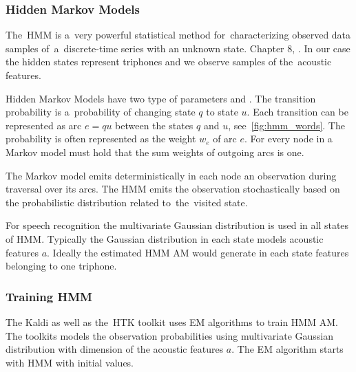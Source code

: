 {%
%     
%     

\subsubsection*{Hidden Markov Models}
The~\ac{HMM} is a~very powerful statistical method for~characterizing observed data samples
of~a~discrete-time series with an unknown state. Chapter 8, \cite{huang2001spoken}.
In our case the hidden states represent triphones and we observe samples of the~acoustic features.

Hidden Markov Models have two type of parameters 
and .
The transition probability is a~probability of changing state $q$ to state $u$.
Each transition can be represented as arc $e=qu$ between the states $q$ and $u$, see~\ref{fig:hmm_words}.
The probability is often represented as the weight $w_e$ of arc $e$.
For every node in a Markov model must hold that the sum weights of outgoing arcs is one.

The Markov model emits deterministically in each node an observation during traversal over its arcs.
The \acl{HMM} emits the observation stochastically based on the probabilistic distribution related
to~the~visited state.

For speech recognition the multivariate Gaussian distribution is used in all states of \ac{HMM}. 
Typically the Gaussian distribution in each state models acoustic features $a$.
Ideally the estimated \ac{HMM} \ac{AM} would generate in each state features belonging to one triphone.

\subsubsection*{Training \ac{HMM}}
\label{sub:trainhmm}

The Kaldi as well as the~\ac{HTK} toolkit uses \acl{EM} algorithms to train \ac{HMM} \acl{AM}.
The toolkits models the observation probabilities using multivariate Gaussian distribution 
with dimension of the acoustic features $a$.
The \ac{EM} algorithm starts with \ac{HMM} with initial values. 

}
